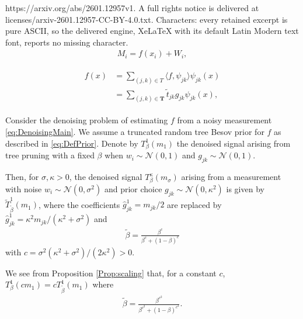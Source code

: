 \documentclass[10pt,a4paper]{amsart}
\newcommand{\Nn}{{\mathcal N}}
\newcommand{\oT}{\boldsymbol{T}}
\newcommand{\wt}{{\widetilde t}}
\begin{document}
https://arxiv.org/abs/2601.12957v1. A full rights notice is delivered at licenses/arxiv-2601.12957-CC-BY-4.0.txt. Characters: every retained excerpt is pure ASCII, so the delivered engine, XeLaTeX with its default Latin Modern text font, reports no missing character.
\begin{align}\label{eq:DenoisingMain}
    M_i=f(x_i)+W_i,
\end{align}

\begin{align}\label{eq:DefPrior}
\begin{split}
f(x) & =\sum_{(j,k)\in T} \langle f,\psi_{jk}\rangle\psi_{jk}(x)\\
& =\sum_{(j,k)\in \oT} \wt_{jk} g_{jk}\psi_{jk}(x),
\end{split}
\end{align}

\begin{proposition}\label{Prop:scaling}
Consider the denoising problem of estimating $f$ from a noisy measurement \eqref{eq:DenoisingMain}. We assume a truncated random tree Besov prior for $f$ as described in \eqref{eq:DefPrior}. Denote by $T^{1}_\beta(m_1)$ the denoised signal arising from tree pruning with a fixed $\beta$ when $w_i\sim \Nn(0,1)$ and $g_{jk}\sim\Nn(0,1)$. 

Then, for $\sigma,\kappa>0$, the denoised signal $T^{\kappa}_\beta(m_\sigma)$ arising from a measurement with noise $w_i\sim\Nn(0,\sigma^2)$ and prior choice $g_{jk}\sim\Nn(0,\kappa^2)$ is given by $\tilde{T}^1_{\tilde{\beta}}(m_1)$, where the coefficients $\hat{g}^1_{jk}=m_{jk}/2$ are replaced by $\hat{g}^1_{jk}=\kappa^2m_{jk}/(\kappa^2+\sigma^2)$ and
\begin{align*}
    \widetilde{\beta}=\frac{\beta^{c}}{\beta^{c}+(1-\beta)^{c}}
\end{align*}
with $c=\sigma^2(\kappa^2+\sigma^2)/(2\kappa^2)>0$.
\end{proposition}

\begin{remark}
We see from Proposition \ref{Prop:scaling} that, for a constant $c$, $T^1_\beta(cm_1) =cT^1_{\widetilde{\beta}}(m_1)$ where 
\begin{align*}
    \widetilde{\beta}=\frac{\beta^{c^2}}{\beta^{c^2}+(1-\beta)^{c^2}}.
\end{align*}
\end{remark}
\end{document}

